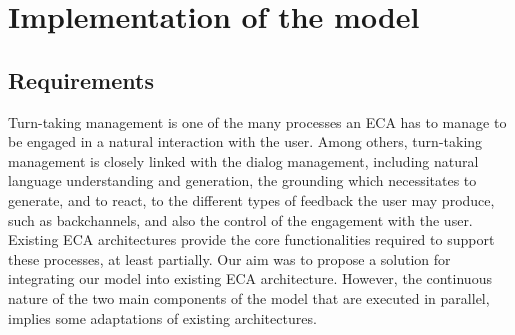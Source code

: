 \section{Implementation of the model}
\label{impl}

\subsection{Requirements}

Turn-taking management is one of the many processes an ECA has to manage to be engaged in a natural interaction with the user. 
Among others, turn-taking management is closely linked with 
the dialog management, including natural language understanding and generation, 
the grounding which necessitates to generate, and to react, to the different types of feedback the user may produce, such as backchannels, 
and also the control of the engagement with the user. 
Existing ECA architectures provide the core functionalities required to support these processes, at least partially. 
Our aim was to propose a solution for integrating our model into existing ECA architecture.
However, the continuous nature of the two main components of the model that are executed in parallel, implies some adaptations of existing architectures. 




